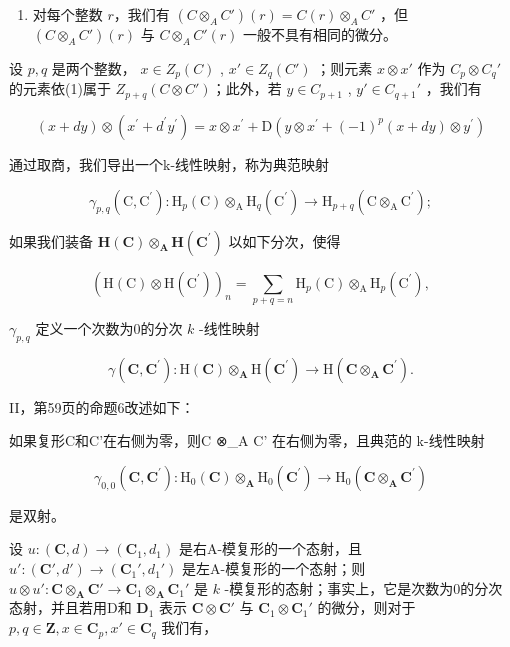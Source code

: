 \begin{enumerate}
\def\labelenumi{\arabic{enumi})}
\setcounter{enumi}{1}
\tightlist
\item
  对每个整数 \(r\)，我们有 \((C \otimes_{A} C')(r) = C(r) \otimes_{A} C'\) ，但 \((C \otimes_{A} C')(r)\) 与 \(C \otimes_{A} C'(r)\) 一般不具有相同的微分。
\end{enumerate}

设 \(p, q\) 是两个整数， \(x \in Z_p(C)\) , \(x' \in Z_q(C')\) ；则元素 \(x \otimes x'\) 作为 \(C_p \otimes C_q'\) 的元素依(1)属于 \(Z_{p+q}(C \otimes C')\)；此外，若 \(y \in C_{p+1}\) , \(y' \in C_{q+1}'\) ，我们有

\[
(x + d y) \otimes (x ^ {\prime} + d ^ {\prime} y ^ {\prime}) = x \otimes x ^ {\prime} + \mathrm{D} (y \otimes x ^ {\prime} + (- 1) ^ {p} (x + d y) \otimes y ^ {\prime})
\]

通过取商，我们导出一个k-线性映射，称为典范映射

\[
\gamma_ {p, q} (\mathrm{C}, \mathrm{C} ^ {\prime}): \mathrm{H} _ {p} (\mathrm{C}) \otimes_ {\mathrm{A}} \mathrm{H} _ {q} (\mathrm{C} ^ {\prime}) \rightarrow \mathrm{H} _ {p + q} (\mathrm{C} \otimes_ {\mathrm{A}} \mathrm{C} ^ {\prime});
\]

如果我们装备 \(\mathbf{H}(\mathbf{C})\otimes_{\mathbf{A}}\mathbf{H}(\mathbf{C}^{\prime})\) 以如下分次，使得

\[
\left(\mathrm{H} (\mathrm{C}) \otimes \mathrm{H} (\mathrm{C} ^ {\prime})\right) _ {n} = \sum_ {p + q = n} \mathrm{H} _ {p} (\mathrm{C}) \otimes_ {\mathrm{A}} \mathrm{H} _ {p} (\mathrm{C} ^ {\prime}),
\]

\(\gamma_{p,q}\) 定义一个次数为0的分次 \(k\) -线性映射

\[
\gamma (\mathbf {C}, \mathbf {C} ^ {\prime}): \mathrm{H} (\mathbf {C}) \otimes_ {\mathbf {A}} \mathrm{H} (\mathbf {C} ^ {\prime}) \rightarrow \mathrm{H} (\mathbf {C} \otimes_ {\mathbf {A}} \mathbf {C} ^ {\prime}).
\]

II，第59页的命题6改述如下：

如果复形C和C'在右侧为零，则C ⊗\_A C' 在右侧为零，且典范的 k-线性映射

\[
\gamma_ {0, 0} (\mathbf {C}, \mathbf {C} ^ {\prime}): \mathrm{H} _ {0} (\mathbf {C}) \otimes_ {\mathbf {A}} \mathrm{H} _ {0} (\mathbf {C} ^ {\prime}) \rightarrow \mathrm{H} _ {0} (\mathbf {C} \otimes_ {\mathbf {A}} \mathbf {C} ^ {\prime})
\]

是双射。

设 \(u: (\mathbf{C}, d) \to (\mathbf{C}_1, d_1)\) 是右A-模复形的一个态射，且 \(u': (\mathbf{C}', d') \to (\mathbf{C}_1', d_1')\) 是左A-模复形的一个态射；则 \(u \otimes u': \mathbf{C} \otimes_{\mathbf{A}} \mathbf{C}' \to \mathbf{C}_1 \otimes_{\mathbf{A}} \mathbf{C}_1'\) 是 \(k\) -模复形的态射；事实上，它是次数为0的分次态射，并且若用D和 \(\mathbf{D}_1\) 表示 \(\mathbf{C} \otimes \mathbf{C}'\) 与 \(\mathbf{C}_1 \otimes \mathbf{C}_1'\) 的微分，则对于 \(p, q \in \mathbf{Z}, x \in \mathbf{C}_p, x' \in \mathbf{C}_q\) 我们有，

